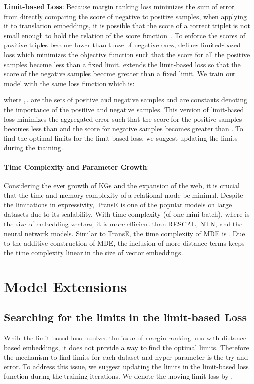 \documentclass{ecai}
\begin{document}
\textbf{Limit-based Loss:}
Because margin ranking loss minimizes the sum of error from directly comparing the score of negative to positive samples, when applying it to translation embeddings, it is possible that the score of a correct triplet is not small enough to hold the relation of the score function~\cite{zhou2017learning}. To enforce the scores of positive triples become lower than those of negative ones, \cite{zhou2017learning} defines limited-based loss which minimizes the objective function such that the score for all the positive samples become less than a fixed limit. \cite{sun2018bootstrapping} extends the limit-based loss so that the score of the negative samples become greater than a fixed limit. We train our model with the same loss function which is:



where ,\,.  are the sets of positive and negative samples and  are constants denoting the importance of the positive and negative samples. This version of limit-based loss minimizes the aggregated error such that the score for the positive samples becomes less than  and the score for negative samples becomes greater than . To find the optimal limits for the limit-based loss, we suggest updating the limits during the training.

\paragraph*{Time Complexity and Parameter Growth:}
Considering the ever growth of KGs and the expansion of the web, it is crucial that the time and memory complexity of a relational mode be minimal. Despite the limitations in expressivity, TransE is one of the popular models on large datasets due to its scalability. With  time complexity (of one mini-batch), where  is the size of embedding vectors, it is more efficient than RESCAL, NTN, and the neural network models. 
Similar to TransE, the time complexity of MDE is . Due to the additive construction of MDE, the inclusion of more distance terms keeps the time complexity linear in the size of vector embeddings.


\section{Model Extensions}\label{sec:extensions}
\subsection{Searching for the limits in the limit-based Loss}
While the limit-based loss resolves the issue of margin ranking loss with distance based embeddings, it does not provide a way to find the optimal limits. Therefore the mechanism to find limits for each dataset and hyper-parameter is the try and error. To address this issue, we suggest updating the limits in the limit-based loss function during the training iterations. We denote the moving-limit loss by .
\end{document}
